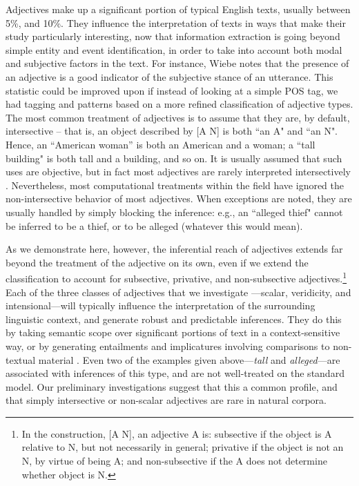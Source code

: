 \documentclass[10pt]{article}
\begin{document}
Adjectives make up a significant portion of typical English texts, usually between 5\%, and 10\%. They influence the interpretation of texts in ways that make their study particularly interesting, now that information extraction is going beyond simple entity and event identification, in order to take into account both modal and subjective factors in the text. For instance, Wiebe \cite{wiebe00learningsubjective} notes that the presence of an adjective is a good indicator of the subjective stance of an utterance. This statistic could be improved upon if instead of looking at a simple POS tag, we had  tagging and patterns based on a more refined  classification of adjective types. The most common treatment of adjectives is to assume that they are, by default, {\sc intersective} -- that is, an object described by [A N] is both ``an A" and ``an N". Hence, an ``American woman'' is both an American and a woman; a ``tall building" is both tall and a building, and so on. 
It is usually assumed that such uses are objective, but in fact most adjectives are rarely interpreted intersectively \cite{giegerich2005associative}. Nevertheless, most computational treatments  within the field have ignored the non-intersective behavior of most adjectives.   When exceptions are noted, they are usually handled by simply blocking the inference: e.g., an ``alleged thief" cannot be inferred to be a thief, or to be alleged (whatever this would mean). 


As we demonstrate here, however,  the inferential reach of adjectives extends far beyond the treatment of the adjective on its own,  even if we extend the classification to  account for subsective, privative, and non-subsective adjectives.\footnote{
In the construction, [A N], an adjective A is:  {\sc subsective} if the object is A relative to N, but not necessarily in general; {\sc privative} if the object 
is not an N, by virtue of being A; and 
{\sc non-subsective} if the A  does not determine whether object is N.}
Each of the three classes of adjectives that we investigate ---scalar, veridicity, and intensional---will typically influence the interpretation  of the surrounding linguistic context, and generate robust and predictable inferences.  They do this by taking semantic scope over significant portions of text in a context-sensitive way, or by generating entailments and implicatures involving comparisons to non-textual material 
\cite{lassiter14adjectives}. 
%
Even two of the examples given above---\emph{tall} and \emph{alleged}---are associated with inferences of this type, and are not well-treated on the standard model. Our preliminary investigations suggest that this a common profile, and that simply intersective or non-scalar adjectives are rare in natural corpora.
\end{document}
